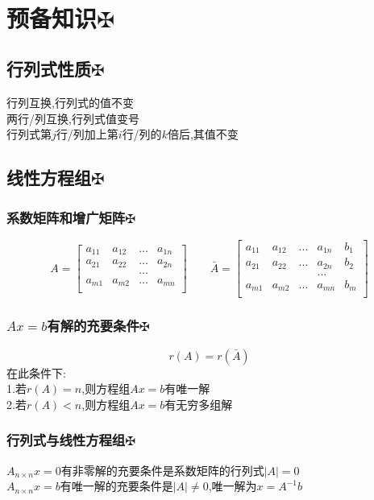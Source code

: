 \documentclass[11pt, a4paper, UTF8]{ctexart}
\begin{document}
\indent\\
\large
\raggedright
\def\fuck{\maltese}
\def\shit#1{#1\protect\hyperlink{catalog}{$\fuck$}}
\hypertarget{catalog}{}
\tableofcontents
\setcounter{secnumdepth}{-1}
\section{\shit{预备知识}}
\subsection{\shit{行列式性质}}
行列互换,行列式的值不变\\
两行/列互换,行列式值变号\\
行列式第$j$行/列加上第$i$行/列的$k$倍后,其值不变
\subsection{\shit{线性方程组}}
\subsubsection{\shit{系数矩阵和增广矩阵}}
\[
A=\begin{bmatrix}
a_{11}&a_{12}&...&a_{1n}\\
a_{21}&a_{22}&...&a_{2n}\\
&&...&\\
a_{m1}&a_{m2}&...&a_{mn}\\
\end{bmatrix}
\qquad\bar A=\begin{bmatrix}
a_{11}&a_{12}&...&a_{1n}&b_1\\
a_{21}&a_{22}&...&a_{2n}&b_2\\
&&&...&\\
a_{m1}&a_{m2}&...&a_{mn}&b_m\\
\end{bmatrix}\]
\subsubsection{\shit{$Ax=b$有解的充要条件}}
\[r(A)=r(\bar A)\]
在此条件下:\\
1.若$r(A)=n$,则方程组$Ax=b$有唯一解\\
2.若$r(A)<n$,则方程组$Ax=b$有无穷多组解
\subsubsection{\shit{行列式与线性方程组}}
$A_{n\times n}x=0$有非零解的充要条件是系数矩阵的行列式$|A|=0$\\
$A_{n\times n}x=b$有唯一解的充要条件是$|A|\not=0$,唯一解为$x=A^{-1}b$
\end{document}
